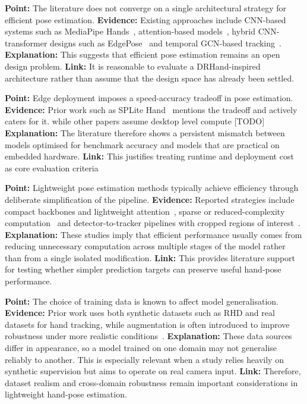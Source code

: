 \documentclass[10pt,letterpaper]{article}
\begin{document}
\medskip
\noindent\textbf{Point:} The literature does not converge on a single architectural strategy for efficient pose estimation.  
\textbf{Evidence:} Existing approaches include CNN-based systems such as MediaPipe Hands~\cite{mediapipe}, attention-based models~\cite{attentionlite}, hybrid CNN-transformer designs such as EdgePose~\cite{edgepose} and temporal GCN-based tracking~\cite{handobjectgcn}.  
\textbf{Explanation:} This suggests that efficient pose estimation remains an open design problem.  
\textbf{Link:} It is reasonable to evaluate a DRHand-inspired architecture rather than assume that the design space has already been settled.

\medskip
\noindent\textbf{Point:} Edge deployment imposes a speed-accuracy tradeoff in pose estimation.  
\textbf{Evidence:} Prior work such as SPLite Hand~\cite{splitehand} mentions the tradeoff and actively caters for it. while other papers assume desktop level compute [TODO]  
\textbf{Explanation:} The literature therefore shows a persistent mismatch between models optimised for benchmark accuracy and models that are practical on embedded hardware.  
\textbf{Link:} This justifies treating runtime and deployment cost as core evaluation criteria

\medskip
\noindent\textbf{Point:} Lightweight pose estimation methods typically achieve efficiency through deliberate simplification of the pipeline.  
\textbf{Evidence:} Reported strategies include compact backbones and lightweight attention~\cite{attentionlite}, sparse or reduced-complexity computation~\cite{splitehand} and detector-to-tracker pipelines with cropped regions of interest~\cite{mediapipe}.  
\textbf{Explanation:} These studies imply that efficient performance usually comes from reducing unnecessary computation across multiple stages of the model rather than from a single isolated modification.  
\textbf{Link:} This provides literature support for testing whether simpler prediction targets can preserve useful hand-pose performance.

\medskip
\noindent\textbf{Point:} The choice of training data is known to affect model generalisation.  
\textbf{Evidence:} Prior work uses both synthetic datasets such as RHD and real datasets for hand tracking, while augmentation is often introduced to improve robustness under more realistic conditions~\cite{handobjectgcn,lightweightgcnhand,handaugment}.  
\textbf{Explanation:} These data sources differ in appearance, so a model trained on one domain may not generalise reliably to another. This is especially relevant when a study relies heavily on synthetic supervision but aims to operate on real camera input.  
\textbf{Link:} Therefore, dataset realism and cross-domain robustness remain important considerations in lightweight hand-pose estimation.
\end{document}
